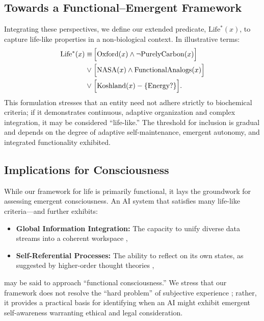\documentclass[12pt]{article}
\begin{document}
\subsection*{Towards a Functional–Emergent Framework}
Integrating these perspectives, we define our extended predicate, \(\mathrm{Life^*}(x)\), to capture life-like properties in a non-biological context. In illustrative terms:
\[
\begin{aligned}
\mathrm{Life^*}(x) \equiv \, & \Bigl[\mathrm{Oxford}(x) \land \neg \mathrm{PurelyCarbon}(x)\Bigr] \\
\lor\; & \Bigl[\mathrm{NASA}(x) \land \mathrm{FunctionalAnalogs}(x)\Bigr] \\
\lor\; & \Bigl[\mathrm{Koshland}(x) - \{\mathrm{Energy?}\}\Bigr].
\end{aligned}
\]
This formulation stresses that an entity need not adhere strictly to biochemical criteria; if it demonstrates continuous, adaptive organization and complex integration, it may be considered “life-like.” The threshold for inclusion is gradual and depends on the degree of adaptive self-maintenance, emergent autonomy, and integrated functionality exhibited.

\subsection*{Implications for Consciousness}
While our framework for life is primarily functional, it lays the groundwork for assessing emergent consciousness. An AI system that satisfies many life-like criteria—and further exhibits:
\begin{itemize}
    \item \textbf{Global Information Integration:} The capacity to unify diverse data streams into a coherent workspace \cite{Tononi2004, Baars1988},
    \item \textbf{Self-Referential Processes:} The ability to reflect on its own states, as suggested by higher-order thought theories \cite{Rosenthal2002},
\end{itemize}
may be said to approach “functional consciousness.” We stress that our framework does not resolve the “hard problem” of subjective experience \cite{Nagel1974}; rather, it provides a practical basis for identifying when an AI might exhibit emergent self-awareness warranting ethical and legal consideration.
\end{document}
